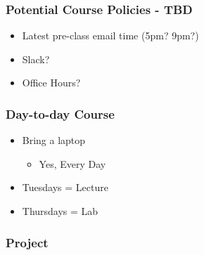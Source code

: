 \documentclass[14pt]{beamer}
\begin{document}
\begin{frame}
\frametitle{Potential Course Policies - TBD}
\begin{itemize}
\item<1-> Latest pre-class email time (5pm? 9pm?)
\item<2-> Slack?
\item<3-> Office Hours?
\end{itemize}
%
\end{frame}

\begin{frame}
\frametitle{Day-to-day Course}
\begin{itemize}
\item<1-> Bring a laptop
\begin{itemize}
	\item<2-> Yes, Every Day
\end{itemize}
\item<3-> Tuesdays = Lecture
\item<4-> Thursdays = Lab
\end{itemize}
\end{frame}
\begin{frame}
\frametitle{Project}
\end{frame}
\end{document}
